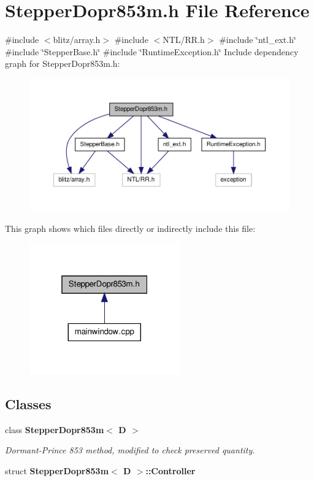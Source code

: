 \section{\-Stepper\-Dopr853m.\-h \-File \-Reference}
\label{_stepper_dopr853m_8h}
{\ttfamily \#include $<$blitz/array.\-h$>$}\*
{\ttfamily \#include $<$\-N\-T\-L/\-R\-R.\-h$>$}\*
{\ttfamily \#include \char`\"{}ntl\-\_\-ext.\-h\char`\"{}}\*
{\ttfamily \#include \char`\"{}\-Stepper\-Base.\-h\char`\"{}}\*
{\ttfamily \#include \char`\"{}\-Runtime\-Exception.\-h\char`\"{}}\*
\-Include dependency graph for \-Stepper\-Dopr853m.\-h\-:
\nopagebreak
\begin{figure}[H]
\begin{center}
\leavevmode
\includegraphics[width=350pt]{_stepper_dopr853m_8h__incl}
\end{center}
\end{figure}
\-This graph shows which files directly or indirectly include this file\-:
\nopagebreak
\begin{figure}[H]
\begin{center}
\leavevmode
\includegraphics[width=184pt]{_stepper_dopr853m_8h__dep__incl}
\end{center}
\end{figure}
\subsection*{\-Classes}
\begin{DoxyCompactItemize}
\item 
class {\bf \-Stepper\-Dopr853m$<$ D $>$}
\begin{DoxyCompactList}\small\item\em \-Dormant-\/\-Prince 853 method, modified to check preserved quantity. \end{DoxyCompactList}\item 
struct {\bf \-Stepper\-Dopr853m$<$ D $>$\-::\-Controller}
\end{DoxyCompactItemize}
